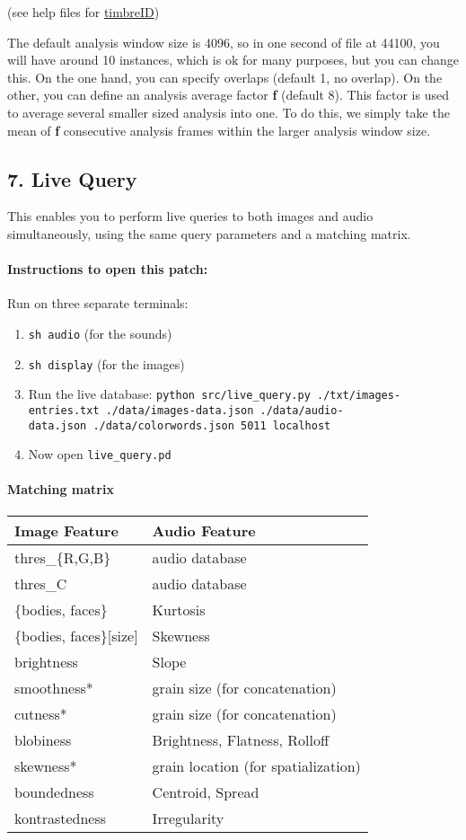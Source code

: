 (see help files for \href{https://github.com/wbrent/timbreID}{timbreID})

The default analysis window size is 4096, so in one second of file at 44100, you will have around 10 instances, which is ok for many purposes, but you can change this. On the one hand, you can specify overlaps (default 1, no overlap). On the other, you can define an analysis average factor \textbf{f} (default 8). This factor is used to average several smaller sized analysis into one. To do this, we simply take the mean of \textbf{f} consecutive analysis frames within the larger analysis window size.



\subsection*{7. Live Query}

This enables you to perform live queries to both images and audio simultaneously, using the same query parameters and a matching matrix.


\paragraph{Instructions to open this patch:}

Run on three separate terminals:

\begin{enumerate}
\def\labelenumi{\arabic{enumi}.}
  \singlespacing
\tightlist
\item
  \texttt{sh\ audio} (for the sounds)
\item
  \texttt{sh\ display} (for the images)
\item
  Run the live database: \texttt{python\ src/live\_query.py\ ./txt/images-entries.txt\ ./data/images-data.json\ ./data/audio-data.json\ ./data/colorwords.json\ 5011\ localhost}
\item
  Now open \texttt{live\_query.pd}
\end{enumerate}


\paragraph{Matching matrix}

\begin{longtable}[]{@{}ll@{}}
\toprule
Image Feature & Audio Feature\tabularnewline
\midrule
\endhead
thres\_\{R,G,B\} & audio database\tabularnewline
thres\_C & audio database\tabularnewline
\{bodies, faces\} & Kurtosis\tabularnewline
\{bodies, faces\}{[}size{]} & Skewness\tabularnewline
brightness & Slope\tabularnewline
smoothness* & grain size (for concatenation)\tabularnewline
cutness* & grain size (for concatenation)\tabularnewline
blobiness & Brightness, Flatness, Rolloff\tabularnewline
skewness* & grain location (for spatialization)\tabularnewline
boundedness & Centroid, Spread\tabularnewline
kontrastedness & Irregularity\tabularnewline
\bottomrule
\end{longtable}

